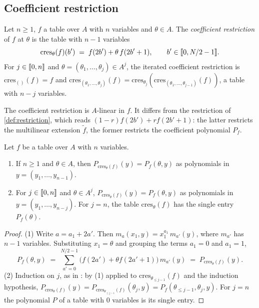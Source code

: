 \subsection{Coefficient restriction}\label{sec:restriction:cres}

\begin{definition}\label{def:cres}
Let $n \ge 1$, $f$ a table over $A$ with $n$ variables and $\theta \in A$.
The \emph{coefficient restriction} of $f$ at $\theta$ is the table with $n-1$ variables
\[
  \mathrm{cres}_\theta(f)(b') \;=\; f(2b') + \theta\, f(2b'+1), \qquad b' \in \llbracket 0, N/2-1 \rrbracket.
\]
For $j \in \llbracket 0, n \rrbracket$ and $\theta = (\theta_1,\dots,\theta_j) \in A^j$, the iterated coefficient restriction is $\mathrm{cres}_{()}(f) = f$ and $\mathrm{cres}_{(\theta_1,\dots,\theta_j)}(f) = \mathrm{cres}_{\theta_j}(\mathrm{cres}_{(\theta_1,\dots,\theta_{j-1})}(f))$, a table with $n-j$ variables.
\end{definition}

The coefficient restriction is $A$-linear in $f$.
It differs from the restriction of \cref{def:restriction}, which reads $(1-r) f(2b') + r f(2b'+1)$: the latter restricts the multilinear extension $\tilde f$, the former restricts the coefficient polynomial $P_f$.

\begin{lemma}\label{lem:cres}
Let $f$ be a table over $A$ with $n$ variables.
\begin{enumerate}
  \item If $n \ge 1$ and $\theta \in A$, then $P_{\mathrm{cres}_\theta(f)}(y) = P_f(\theta, y)$ as polynomials in $y = (y_1,\dots,y_{n-1})$.
  \item For $j \in \llbracket 0, n \rrbracket$ and $\theta \in A^j$, $P_{\mathrm{cres}_\theta(f)}(y) = P_f(\theta, y)$ as polynomials in $y = (y_1,\dots,y_{n-j})$. For $j = n$, the table $\mathrm{cres}_\theta(f)$ has the single entry $P_f(\theta)$.
\end{enumerate}
\end{lemma}

\begin{proof}
(1) Write $a = a_1 + 2a'$. Then $m_a(x_1, y) = x_1^{a_1}\, m_{a'}(y)$, where $m_{a'}$ has $n-1$ variables. Substituting $x_1 = \theta$ and grouping the terms $a_1 = 0$ and $a_1 = 1$,
\[
  P_f(\theta, y) \;=\; \sum_{a'=0}^{N/2-1} \bigl( f(2a') + \theta f(2a'+1) \bigr)\, m_{a'}(y) \;=\; P_{\mathrm{cres}_\theta(f)}(y).
\]
(2) Induction on $j$, as in : by (1) applied to $\mathrm{cres}_{\theta_{\le j-1}}(f)$ and the induction hypothesis, $P_{\mathrm{cres}_\theta(f)}(y) = P_{\mathrm{cres}_{\theta_{\le j-1}}(f)}(\theta_j, y) = P_f(\theta_{\le j-1}, \theta_j, y)$.
For $j = n$ the polynomial $P$ of a table with $0$ variables is its single entry.
\end{proof}

